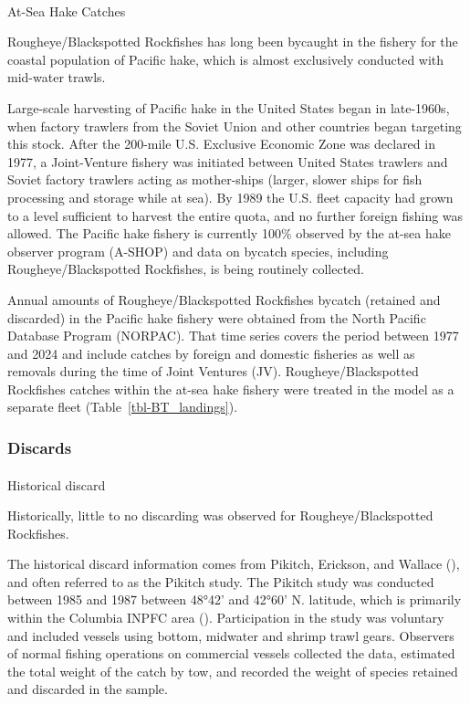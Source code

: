 \documentclass[
]{scrartcl}
\makeatletter
\let\oldparagraph\paragraph
\renewcommand{\paragraph}{
    \@ifstar
      \xxxParagraphStar
      \xxxParagraphNoStar
  }
\newcommand{\xxxParagraphStar}[1]{\oldparagraph*{#1}\mbox{}}
\newcommand{\xxxParagraphNoStar}[1]{\oldparagraph{#1}\mbox{}}
\makeatother
\begin{document}
\paragraph{At-Sea Hake Catches}\label{at-sea-hake-catches}

Rougheye/Blackspotted Rockfishes has long been bycaught in the fishery
for the coastal population of Pacific hake, which is almost exclusively
conducted with mid-water trawls.

Large-scale harvesting of Pacific hake in the United States began in
late-1960s, when factory trawlers from the Soviet Union and other
countries began targeting this stock. After the 200-mile U.S. Exclusive
Economic Zone was declared in 1977, a Joint-Venture fishery was
initiated between United States trawlers and Soviet factory trawlers
acting as mother-ships (larger, slower ships for fish processing and
storage while at sea). By 1989 the U.S. fleet capacity had grown to a
level sufficient to harvest the entire quota, and no further foreign
fishing was allowed. The Pacific hake fishery is currently 100\%
observed by the at-sea hake observer program (A-SHOP) and data on
bycatch species, including Rougheye/Blackspotted Rockfishes, is being
routinely collected.

Annual amounts of Rougheye/Blackspotted Rockfishes bycatch (retained and
discarded) in the Pacific hake fishery were obtained from the North
Pacific Database Program (NORPAC). That time series covers the period
between 1977 and 2024 and include catches by foreign and domestic
fisheries as well as removals during the time of Joint Ventures (JV).
Rougheye/Blackspotted Rockfishes catches within the at-sea hake fishery
were treated in the model as a separate fleet
(Table~\ref{tbl-BT_landings}).

\subsubsection{Discards}\label{discards}

\paragraph{Historical discard}\label{sec-historical_discard}

Historically, little to no discarding was observed for
Rougheye/Blackspotted Rockfishes.

The historical discard information comes from Pikitch, Erickson, and
Wallace (), and often
referred to as the Pikitch study. The Pikitch study was conducted
between 1985 and 1987 between 48°42' and 42°60' N. latitude, which is
primarily within the Columbia INPFC area
(). Participation in the study was voluntary and included vessels
using bottom, midwater and shrimp trawl gears. Observers of normal
fishing operations on commercial vessels collected the data, estimated
the total weight of the catch by tow, and recorded the weight of species
retained and discarded in the sample.
\end{document}
